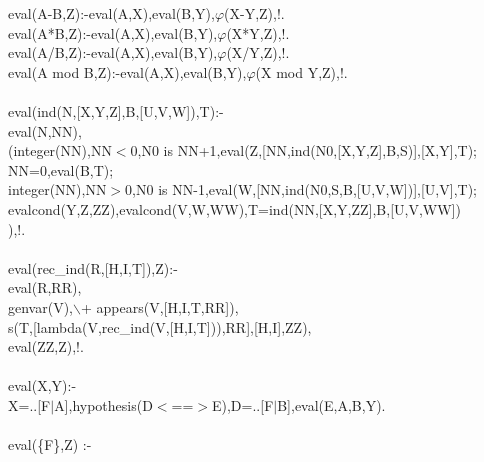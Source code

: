 \documentclass[11pt]{report}
\begin{document}
\begin{sf}
\begin{tabbing}
eval(A-B,Z):-eval(A,X),eval(B,Y),$\varphi$(X-Y,Z),!.\\[-0.15ex]
eval(A*B,Z):-eval(A,X),eval(B,Y),$\varphi$(X*Y,Z),!.\\[-0.15ex]
eval(A/B,Z):-eval(A,X),eval(B,Y),$\varphi$(X/Y,Z),!.\\[-0.15ex]
eval(A mod B,Z):-eval(A,X),eval(B,Y),$\varphi$(X mod Y,Z),!.\\[-0.7ex]
\\[-0.15ex]
eval(ind(N,[X,Y,Z],B,[U,V,W]),T):- \\[-0.15ex]
\hspace{1em}eval(N,NN),\\[-0.15ex]
\hspace{1em}(integer(NN),NN$<$0,N0 is NN+1,eval(Z,[NN,ind(N0,[X,Y,Z],B,S)],[X,Y],T);\\[-0.15ex]
\hspace{2em}NN=0,eval(B,T);\\[-0.15ex]
\hspace{2em}integer(NN),NN$>$0,N0 is NN-1,eval(W,[NN,ind(N0,S,B,[U,V,W])],[U,V],T);\\[-0.15ex]
\hspace{2em}evalcond(Y,Z,ZZ),evalcond(V,W,WW),T=ind(NN,[X,Y,ZZ],B,[U,V,WW])\\[-0.15ex]
\hspace{1em}),!.\\[-0.7ex]
\\[-0.15ex]
eval(rec\_\hspace{0.1em}ind(R,[H,I,T]),Z):-\\[-0.15ex]
\hspace{1em}eval(R,RR),\\[-0.15ex]
\hspace{1em}genvar(V),$\backslash$+ appears(V,[H,I,T,RR]),\\[-0.15ex]
\hspace{1em}s(T,[lambda(V,rec\_\hspace{0.1em}ind(V,[H,I,T])),RR],[H,I],ZZ),\\[-0.15ex]
\hspace{1em}eval(ZZ,Z),!.\\[-0.7ex]
\\[-0.15ex]
eval(X,Y):-\\[-0.15ex]
\hspace{1em}X=..[F$\mid$A],hypothesis(D$<$==$>$E),D=..[F$\mid$B],eval(E,A,B,Y).\\[-0.7ex]
\\[-0.15ex]
eval(\{F\},Z) :-\\[-0.15ex]

\end{tabbing}
\end{sf}
\end{document}
